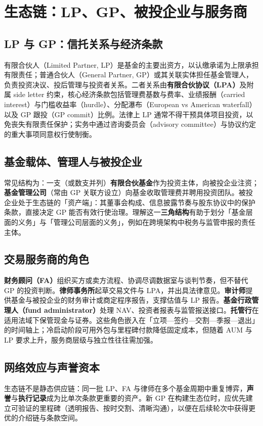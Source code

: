 \chapter{生态链：LP、GP、被投企业与服务商}

\section{LP 与 GP：信托关系与经济条款}

有限合伙人（Limited Partner, LP）是基金的主要出资方，以认缴承诺为上限承担有限责任；普通合伙人（General Partner, GP）或其关联实体担任基金管理人，负责投资决议、投后管理与投资者关系。二者关系由\textbf{有限合伙协议（LPA）}及附属 side letter 约束，核心经济条款包括管理费基数与费率、业绩报酬（carried interest）与门槛收益率（hurdle）、分配瀑布（European vs American waterfall）以及 GP 跟投（GP commit）比例。法律上 LP 通常不得干预具体项目投资，以免丧失有限责任保护；实务中通过咨询委员会（advisory committee）与协议约定的重大事项同意权行使制衡。

\section{基金载体、管理人与被投企业}

常见结构为：一支（或数支并列）\textbf{有限合伙基金}作为投资主体，向被投企业注资；\textbf{基金管理公司}（常由 GP 关联方设立）向基金收取管理费并聘用投资团队。被投企业处于生态链的「资产端」：其董事会构成、信息披露节奏与股东协议中的保护条款，直接决定 GP 能否有效行使治理。理解这一\textbf{三角结构}有助于划分「基金层面的义务」与「管理公司层面的义务」，例如在跨境架构中税务与监管申报的责任主体。

\section{交易服务商的角色}

\textbf{财务顾问（FA）}组织买方或卖方流程、协调尽调数据室与谈判节奏，但不替代 GP 的投资判断。\textbf{律师事务所}起草交易文件与 LPA，并出具法律意见。\textbf{审计师}提供基金与被投企业的财务审计或商定程序报告，支撑估值与 LP 报告。\textbf{基金行政管理人（fund administrator）}处理 NAV、投资者报表与监管报送接口。\textbf{托管行}在适用法域下保管现金与证券。这些角色嵌入在「立项—签约—交割—季报—退出」的时间轴上；冷启动阶段可用外包与里程碑付款降低固定成本，但随着 AUM 与 LP 要求上升，服务商层级与独立性往往需加强。

\section{网络效应与声誉资本}

生态链不是静态供应链：同一批 LP、FA 与律师在多个基金周期中重复博弈，\textbf{声誉}与\textbf{执行记录}成为比单次条款更重要的资产。新 GP 在构建生态位时，应优先建立可验证的里程碑（透明报告、按时交割、清晰沟通），以便在后续轮次中获得更优的介绍链与条款空间。
